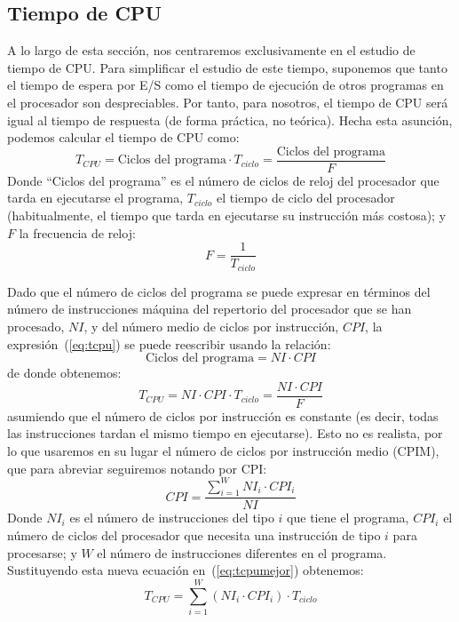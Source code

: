 \subsection{Tiempo de CPU}
A lo largo de esta sección, nos centraremos exclusivamente en el estudio de tiempo de CPU\@. Para simplificar el estudio de este tiempo, suponemos que tanto el tiempo de espera por E/S como el tiempo de ejecución de otros programas en el procesador son despreciables. Por tanto, para nosotros, el tiempo de CPU será igual al tiempo de respuesta (de forma práctica, no teórica). Hecha esta asunción, podemos calcular el tiempo de CPU como:
\begin{equation}
    T_{CPU} = \text{Ciclos del programa} \cdot T_{ciclo} = \dfrac{\text{Ciclos del programa}}{F}
    \label{eq:tcpu}
\end{equation}
Donde ``Ciclos del programa'' es el número de ciclos de reloj del procesador que tarda en ejecutarse el programa, $T_{ciclo}$ el tiempo de ciclo del procesador (habitualmente, el tiempo que tarda en ejecutarse su instrucción más costosa); y $F$ la frecuencia de reloj:
\begin{equation}
    F = \dfrac{1}{T_{ciclo}}
\end{equation}

Dado que el número de ciclos del programa se puede expresar en términos del número de instrucciones máquina del repertorio del procesador que se han procesado, $NI$, y del número medio de ciclos por instrucción, $CPI$, la expresión~(\ref{eq:tcpu}) se puede reescribir usando la relación:
\begin{equation}
    \text{Ciclos del programa} = NI\cdot CPI
\end{equation}
de donde obtenemos:
\begin{equation} \label{eq:tcpumejor}
    T_{CPU} = NI \cdot CPI \cdot T_{ciclo} = \dfrac{NI \cdot CPI}{F}
\end{equation}
asumiendo que el número de ciclos por instrucción es constante (es decir, todas las instrucciones tardan el mismo tiempo en ejecutarse). Esto no es realista, por lo que usaremos en su lugar el número de ciclos por instrucción medio (CPIM), que para abreviar seguiremos notando por CPI:
\begin{equation}
    CPI = \dfrac{\sum\limits_{i=1}^W NI_i \cdot CPI_i}{NI}
\end{equation}
Donde $NI_i$ es el número de instrucciones del tipo $i$ que tiene el programa, $CPI_i$ el número de ciclos del procesador que necesita una instrucción de tipo $i$ para procesarse; y $W$ el número de instrucciones diferentes en el programa. Sustituyendo esta nueva ecuación en~(\ref{eq:tcpumejor}) obtenemos:
\begin{equation}
    T_{CPU} = \sum_{i=1}^W \left(NI_i \cdot CPI_i \right) \cdot T_{ciclo}
\end{equation}

